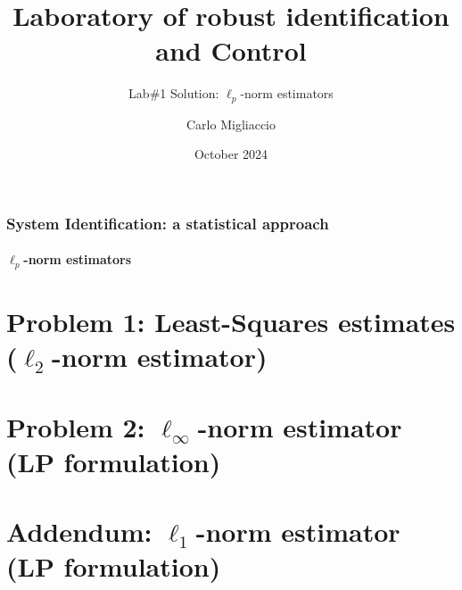 \documentclass{beamer}
\title[SM SysId with EE noise structure]{
    \huge\textbf{Laboratory of robust identification and Control}
}
\subtitle{Lab\#1 Solution: $\ell_p$-norm estimators}
\author[Carlo Migliaccio]{Carlo Migliaccio}
\institute[PoliTO]{Master's Degreee in Computer Engineering\\
Politecnico di Torino}
\date{October 2024}
\begin{document}
\maketitle

\begin{frame}
    \frametitle{System Identification: a statistical approach}
        \framesubtitle{$\ell_p$-norm estimators}
    \tableofcontents
\end{frame}

\section{Problem 1: Least-Squares estimates ($\ell_2$-norm estimator)}

\section{Problem 2: $\ell_\infty$-norm estimator (LP formulation)}

\section{Addendum: $\ell_1$-norm estimator (LP formulation)}
\end{document}
